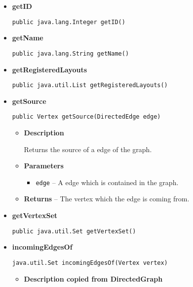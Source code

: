 {{{{{{{{{{{{{{{{\begin{itemize}
{}%
\item{ 
{\bf  getID}\\
\begin{lstlisting}[frame=none]
public java.lang.Integer getID()\end{lstlisting} %
}%
\item{ 
{\bf  getName}\\
\begin{lstlisting}[frame=none]
public java.lang.String getName()\end{lstlisting} %
}%
\item{ 
{\bf  getRegisteredLayouts}\\
\begin{lstlisting}[frame=none]
public java.util.List getRegisteredLayouts()\end{lstlisting} %
}%
\item{ 
{\bf  getSource}\\
\begin{lstlisting}[frame=none]
public Vertex getSource(DirectedEdge edge)\end{lstlisting} %
\begin{itemize}
\item{
{\bf  Description}

Returns the source of a edge of the graph.
}
\item{
{\bf  Parameters}
  \begin{itemize}
   \item{
\texttt{edge} -- A edge which is contained in the graph.}
  \end{itemize}
}%
\item{{\bf  Returns} -- 
The vertex which the edge is coming from. 
}%
\end{itemize}
}%
\item{ 
{\bf  getVertexSet}\\
\begin{lstlisting}[frame=none]
public java.util.Set getVertexSet()\end{lstlisting} %
}%
\item{ 
{\bf  incomingEdgesOf}\\
\begin{lstlisting}[frame=none]
java.util.Set incomingEdgesOf(Vertex vertex)\end{lstlisting} %
\begin{itemize}
\item{
{\bf  Description copied from DirectedGraph{\small {}} }

}
\end{itemize}}
\end{itemize}}}}}}}}}}}}}}}}}
